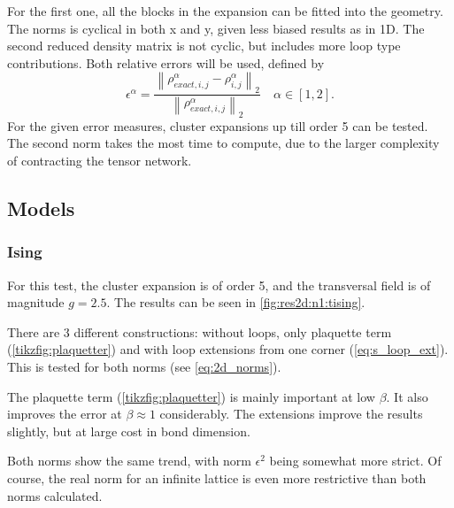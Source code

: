 For the first one, all the blocks in the expansion can be fitted into the geometry. The norms is cyclical in both x and y, given less biased results as in 1D. The second reduced density matrix is not cyclic, but includes more loop type contributions. Both relative errors will be used, defined by
\begin{equation}\label{eq:2d_norms}
    \epsilon^{\alpha} = \frac{  {  \left \|  \rho^{\alpha}_{exact,  i,j}- \rho^{\alpha}_{ i,j}  \right \|} _{2}  }{ {  \left\|  \rho^{\alpha}_{exact,  i,j} \right \|}_2} \quad \alpha \in [1,2] .
\end{equation}
For the given error measures, cluster expansions up till order 5 can be tested. The second norm takes the most time to compute, due to the larger complexity of contracting the tensor network.

\subsection{Models}

\subsubsection{Ising}

For this test, the cluster expansion is of order 5, and the transversal field is of magnitude $g=2.5$. The results can be seen in \cref{fig:res2d:n1:tising}.

There are 3 different constructions: without loops, only plaquette term (\cref{tikzfig:plaquetter}) and with loop extensions from one corner (\cref{eq:s_loop_ext}). This is tested for both norms (see \cref{eq:2d_norms}).

The plaquette term (\cref{tikzfig:plaquetter}) is mainly important at low $\beta$. It also improves the error at $\beta \approx 1$ considerably. The extensions improve the results slightly, but at large cost in bond dimension.

Both norms show the same trend, with norm $\epsilon^2$ being somewhat more strict. Of course, the real norm for an infinite lattice is even more restrictive than both norms calculated.

